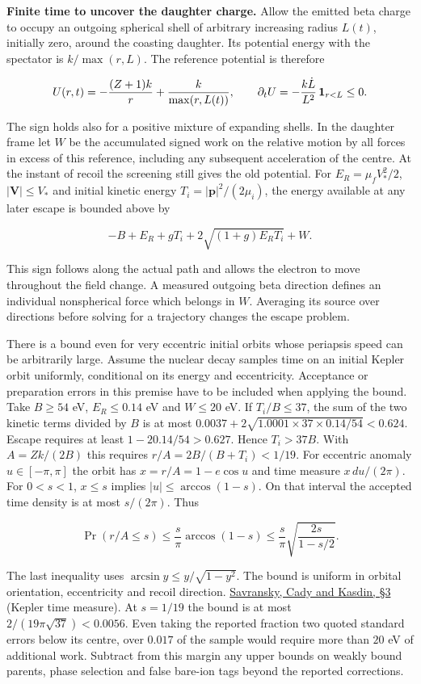 \documentclass[11pt,a4paper]{article}
\begin{document}
\textbf{Finite time to uncover the daughter charge.} Allow the emitted
beta charge to occupy an outgoing spherical shell of arbitrary
increasing radius \(L(t)\), initially zero, around the coasting
daughter. Its potential energy with the spectator is \(k/\max(r,L)\).
The reference potential is therefore

\[
 U(r,t)=-\frac{(Z+1)k}{r}+\frac{k}{\max(r,L(t))},
 \qquad \partial_t U=-\frac{k\dot L}{L^2}\,{\bf1}_{r<L}\le0 .
\]

The sign holds also for a positive mixture of expanding shells. In the
daughter frame let \(W\) be the accumulated signed work on the relative
motion by all forces in excess of this reference, including any
subsequent acceleration of the centre. At the instant of recoil the
screening still gives the old potential. For \(E_R=\mu_f V_*^2/2\),
\(|\boldsymbol V|\le V_*\) and initial kinetic energy
\(T_i=|\boldsymbol p|^2/(2\mu_i)\), the energy available at any later
escape is bounded above by

\[
             -B+E_R+gT_i+2\sqrt{(1+g)E_R T_i}+W .
\]

This sign follows along the actual path and allows the electron to move
throughout the field change. A measured outgoing beta direction defines
an individual nonspherical force which belongs in \(W\). Averaging its
source over directions before solving for a trajectory changes the
escape problem.

There is a bound even for very eccentric initial orbits whose periapsis
speed can be arbitrarily large. Assume the nuclear decay samples time on
an initial Kepler orbit uniformly, conditional on its energy and
eccentricity. Acceptance or preparation errors in this premise have to
be included when applying the bound. Take \(B\ge54\) eV, \(E_R\le0.14\)
eV and \(W\le20\) eV. If \(T_i/B\le37\), the sum of the two kinetic
terms divided by \(B\) is at most
\(0.0037+2\sqrt{1.0001\times37\times0.14/54}<0.624\). Escape requires at
least \(1-20.14/54>0.627\). Hence \(T_i>37B\). With \(A=Zk/(2B)\) this
requires \(r/A=2B/(B+T_i)<1/19\). For eccentric anomaly
\(u\in[-\pi,\pi]\) the orbit has \(x=r/A=1-e\cos u\) and time measure
\(x\,du/(2\pi)\). For \(0<s<1\), \(x\le s\) implies
\(|u|\le\arccos(1-s)\). On that interval the accepted time density is at
most \(s/(2\pi)\). Thus

\[
 \Pr(r/A\le s)\le \frac{s}{\pi}\arccos(1-s)
       \le \frac{s}{\pi}\sqrt{\frac{2s}{1-s/2}} .
\]

The last inequality uses \(\arcsin y\le y/\sqrt{1-y^2}\). The bound is
uniform in orbital orientation, eccentricity and recoil direction.
\href{https://arxiv.org/pdf/1012.1526}{Savransky, Cady and Kasdin, §3}
(Kepler time measure). At \(s=1/19\) the bound is at most
\(2/(19\pi\sqrt{37})<0.0056\). Even taking the reported fraction two
quoted standard errors below its centre, over \(0.017\) of the sample
would require more than \(20\) eV of additional work. Subtract from this
margin any upper bounds on weakly bound parents, phase selection and
false bare-ion tags beyond the reported corrections.
\end{document}
